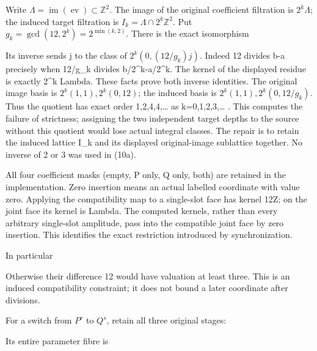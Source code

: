 Write
\(\Lambda=\operatorname{im}(\operatorname{ev})\subset\mathbb Z^2\). The
image of the original coefficient filtration is \(2^k\Lambda\); the
induced target filtration is \(I_k=\Lambda\cap2^k\mathbb Z^2\). Put
\(g_k=\gcd(12,2^k)=2^{\min(k,2)}\). There is the exact isomorphism


Its inverse sends j to the class of \(2^k(0,(12/g_k)j)\). Indeed 12
divides b-a precisely when 12/g\_k divides b/2\^{}k-a/2\^{}k. The kernel
of the displayed residue is exactly 2\^{}k Lambda. These facts prove
both inverse identities. The original image basis is
\(2^k(1,1),2^k(0,12)\); the induced basis is \(2^k(1,1),2^k(0,12/g_k)\).
Thus the quotient has exact order 1,2,4,4,\ldots{} as k=0,1,2,3,\ldots{}
. This computes the failure of strictness; assigning the two independent
target depths to the source without this quotient would lose actual
integral classes. The repair is to retain the induced lattice I\_k and
its displayed original-image sublattice together. No inverse of 2 or 3
was used in (10a).

All four coefficient masks (empty, P only, Q only, both) are retained in
the implementation. Zero insertion means an actual labelled coordinate
with value zero. Applying the compatibility map to a single-slot face
has kernel 12Z; on the joint face its kernel is Lambda. The computed
kernels, rather than every arbitrary single-slot amplitude, pass into
the compatible joint face by zero insertion. This identifies the exact
restriction introduced by synchronization.

In particular


Otherwise their difference 12 would have valuation at least three. This
is an induced compatibility constraint; it does not bound a later
coordinate after divisions.

For a switch from \(P^r\) to \(Q^s\), retain all three original stages:


Its entire parameter fibre is


